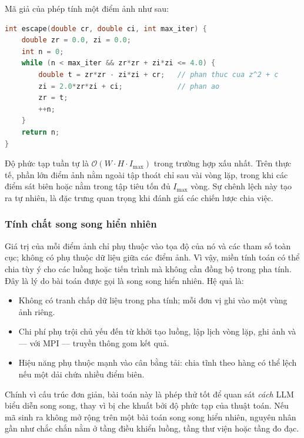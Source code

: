 Mã giả của phép tính một điểm ảnh như sau:

\begin{lstlisting}[language=C++,caption={Tính số vòng lặp thoát cho một điểm ảnh.},label={lst:escape},numbers=none]
int escape(double cr, double ci, int max_iter) {
    double zr = 0.0, zi = 0.0;
    int n = 0;
    while (n < max_iter && zr*zr + zi*zi <= 4.0) {
        double t = zr*zr - zi*zi + cr;   // phan thuc cua z^2 + c
        zi = 2.0*zr*zi + ci;             // phan ao
        zr = t;
        ++n;
    }
    return n;
}
\end{lstlisting}

Độ phức tạp tuần tự là $\mathcal{O}(W\cdot H\cdot I_{\max})$ trong trường hợp xấu
nhất. Trên thực tế, phần lớn điểm ảnh nằm ngoài tập thoát chỉ sau vài vòng lặp,
trong khi các điểm sát biên hoặc nằm trong tập tiêu tốn đủ $I_{\max}$ vòng. Sự
chênh lệch này tạo ra  tự nhiên, là đặc trưng quan trọng
khi đánh giá các chiến lược chia việc.

\subsubsection{Tính chất song song hiển nhiên}

Giá trị của mỗi điểm ảnh chỉ phụ thuộc vào tọa độ của nó và các tham số toàn cục;
không có phụ thuộc dữ liệu giữa các điểm ảnh. Vì vậy, miền tính toán có thể chia
tùy ý cho các luồng hoặc tiến trình mà không cần đồng bộ trong pha tính. Đây là
lý do bài toán được gọi là song song hiển nhiên. Hệ quả là:

\begin{itemize}
  \item Không có tranh chấp dữ liệu trong pha tính; mỗi đơn vị ghi vào một vùng
        ảnh riêng.
  \item Chi phí phụ trội chủ yếu đến từ khởi tạo luồng, lập lịch vòng lặp, ghi
        ảnh và — với MPI — truyền thông gom kết quả.
  \item Hiệu năng phụ thuộc mạnh vào cân bằng tải: chia tĩnh theo hàng có thể
        lệch nếu một dải chứa nhiều điểm biên.
\end{itemize}

Chính vì cấu trúc đơn giản, bài toán này là phép thử tốt để quan sát \emph{cách}
LLM biểu diễn song song, thay vì bị che khuất bởi độ phức tạp của thuật toán.
Nếu mã sinh ra không mở rộng trên một bài toán song song hiển nhiên, nguyên nhân
gần như chắc chắn nằm ở tầng điều khiển luồng, tầng thư viện hoặc tầng đo đạc.

